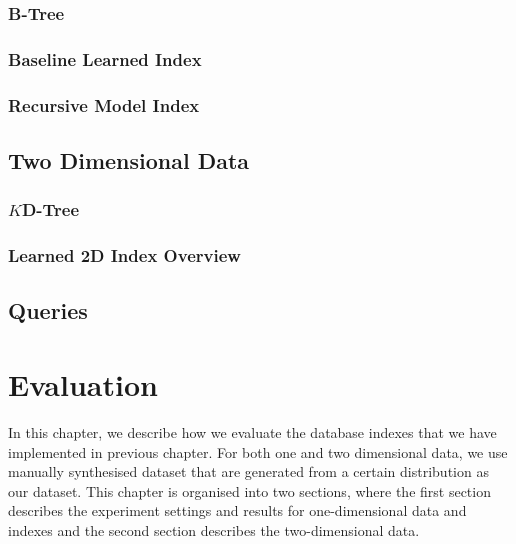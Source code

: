 \documentclass[a4paper,12pt]{scrreprt}
\newenvironment{mscsummary}{\fbox{Summary}}{\medskip}
\begin{document}
\subsection{B-Tree}



\subsection{Baseline Learned Index}



\subsection{Recursive Model Index}



\section{Two Dimensional Data}
\label{sec:two-dim-implementation}

\subsection{$K$D-Tree}



\subsection{Learned 2D Index Overview}



\section{Queries}
\label{sec:queries-implementation}



\chapter{Evaluation}

\begin{mscsummary}
	In this chapter, we describe how we evaluate the database indexes that we have implemented in previous chapter. For both one and two dimensional data, we use manually synthesised dataset that are generated from a certain distribution as our dataset. This chapter is organised into two sections, where the first section describes the experiment settings and results for one-dimensional data and indexes and the second section describes the two-dimensional data.
\end{mscsummary}
\end{document}
